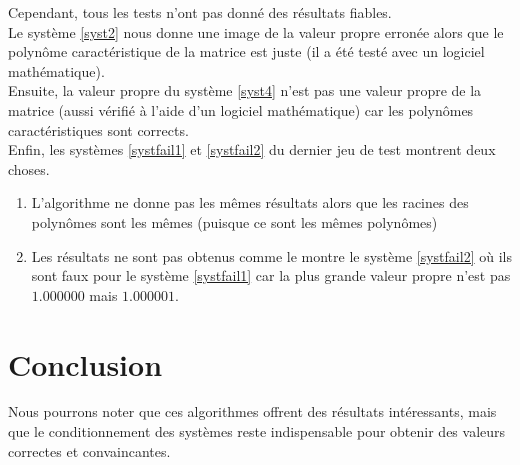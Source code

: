 \documentclass{report}
\begin{document}
    Cependant, tous les tests n'ont pas donné des résultats fiables. \\
    
    Le système \eqref{syst2} nous donne une image de la valeur propre erronée alors que le polynôme caractéristique de la matrice est juste (il a été testé avec un logiciel mathématique). \\
    Ensuite, la valeur propre du système \eqref{syst4} n'est pas une valeur propre de la matrice (aussi vérifié à l'aide d'un logiciel mathématique) car les polynômes caractéristiques sont corrects. \\
    Enfin, les systèmes \eqref{systfail1} et \eqref{systfail2} du dernier jeu de test montrent deux choses.
    \begin{enumerate}
    \item{L'algorithme ne donne pas les mêmes résultats alors que les racines des polynômes sont les mêmes (puisque ce sont les mêmes polynômes)}
    \item{Les résultats ne sont pas obtenus comme le montre le système \eqref{systfail2} où ils sont faux pour le système \eqref{systfail1} car la plus grande valeur propre n'est pas $1.000000$ mais $1.000001$.}
    \end{enumerate}
    
  \chapter{Conclusion}
    Nous pourrons noter que ces algorithmes offrent des résultats intéressants, mais que le conditionnement des systèmes reste indispensable pour obtenir des valeurs correctes et convaincantes.\\
    
\end{document}
